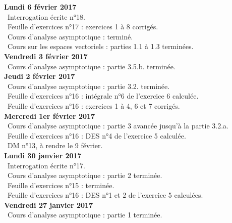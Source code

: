 \documentclass[12pt,a4paper]{article}
\begin{document}
\noindent\textbf{Lundi 6 février 2017}\\
\bu\ Interrogation écrite n°18.\\
\bu\ Feuille d'exercices n°17 : exercices 1 à 8 corrigés.\\
\bu\ Cours d'analyse asymptotique : terminé.\\
\bu\ Cours sur les espaces vectoriels : parties 1.1 à 1.3 terminées.\vspace{.4cm}\\

\noindent\textbf{Vendredi 3 février 2017}\\
\bu\ Cours d'analyse asymptotique : partie 3.5.b. terminée.\vspace{.4cm}\\

\noindent\textbf{Jeudi 2 février 2017}\\
\bu\ Cours d'analyse asymptotique : partie 3.2. terminée.\\
\bu\ Feuille d'exercices n°16 : intégrale n°6 de l'exercice 6 calculée.\\
\bu\ Feuille d'exercices n°16 : exercices 1 à 4, 6 et 7 corrigés.\vspace{.4cm}\\

\noindent\textbf{Mercredi 1er février 2017}\\
\bu\ Cours d'analyse asymptotique : partie 3 avancée jusqu'à la partie 3.2.a.\\
\bu\ Feuille d'exercices n°16 : DES n°4 de l'exercice 5 calculée.\\
\bu\ DM n°13, à rendre le 9 février.\vspace{.4cm}\\

\noindent\textbf{Lundi 30 janvier 2017}\\
\bu\ Interrogation écrite n°17.\\
\bu\ Cours d'analyse asymptotique : partie 2 terminée.\\
\bu\ Feuille d'exercices n°15 : terminée.\\
\bu\ Feuille d'exercices n°16 : DES n°1 et 2 de l'exercice 5 calculées.\vspace{.4cm}\\

\noindent\textbf{Vendredi 27 janvier 2017}\\
\bu\ Cours d'analyse asymptotique : partie 1 terminée. \vspace{.4cm}\\
\end{document}
